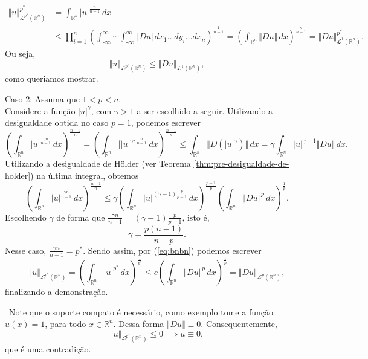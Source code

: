 \documentclass[a4paper, 11pt]{book}
\theoremstyle{definition}
\newcommand{\obs}{\noindent{\textbf{\textcolor{black}{\sffamily Observação:}}}~}
\newcommand{\m}{\text{-}}
\newcommand{\bR}{\mathbb{R}}
\newcommand{\cL}{\mathcal{L}}
\begin{document}
\begin{prf}
    \[
        \begin{aligned}
            \Vert u \Vert_{\cL^{p^*}(\bR^n)}^{p^*} &= \int_{\bR^n} |u|^{\frac{n}{n-1}} \, dx \\
            &\leqslant \prod_{i=1}^n \left( \int_{\m\infty}^{\infty} \cdots \int_{\m\infty}^\infty \Vert Du \Vert dx_1\dots dy_i \dots dx_n \right)^{\frac{1}{n-1}}
            = \left(\int_{\bR^n} \Vert Du \Vert\,dx\right)^{\frac{n}{n-1}} = \Vert Du \Vert_{\cL^1(\bR^n)}^{p^*}.
        \end{aligned}
    \]
    Ou seja,
    \begin{equation} \label{eq:desigualdadegnss}
        \Vert u \Vert_{\cL^{p^*}(\bR^n)} \leqslant\Vert Du \Vert_{\cL^1(\bR^n)},
    \end{equation}
    como queriamos mostrar.

    \underline{Caso 2:} Assuma que $1 < p < n$.\\
    Considere a função $|u|^\gamma$, com $\gamma > 1$ a ser escolhido a seguir. Utilizando a desigualdade obtida no caso $p = 1$, podemos escrever
    \[
        \left( \int_{\bR^n} |u|^{\frac{\gamma n}{n - 1}}  \, dx\right)^{\frac{n-1}{n}} = \left( \int_{\bR^n} \Big[ |u|^\gamma \Big]^{\frac{n}{n-1}} \,dx \right)^{\frac{n-1}{n}} \leqslant \int_{\bR^n} \Vert D(|u|^{\gamma}) \Vert \,dx = \gamma \int_{\bR^n} |u|^{\gamma-1} \Vert Du \Vert \,dx.
    \]
    Utilizando a desigualdade de Hölder (ver Teorema \ref{thm:pre-desigualdade-de-holder}) na última integral, obtemos
    \begin{equation} \label{eq:bnbn}
        \left( \int_{\bR^n} |u|^{\frac{\gamma n}{n - 1}}  \, dx\right)^{\frac{n-1}{n}} \leqslant \gamma\left( \int_{\bR^n} |u|^{(\gamma-1)\frac{p}{p-1}} \,dx \right)^{\frac{p-1}{p}} \left( \int_{\bR^n} \Vert Du \Vert^p \,dx \right)^{\frac{1}{p}}.
    \end{equation}
    Escolhendo $\gamma$ de forma que $\displaystyle\frac{\gamma n}{n - 1} = (\gamma -1)\frac{p}{p-1}$, isto é,
    \[
        \gamma = \frac{p(n-1)}{n-p}.
    \]
    Nesse caso, $\displaystyle\frac{\gamma n}{n-1} = p^*$. Sendo assim, por (\ref{eq:bnbn}) podemos escrever
    \[
        \Vert u \Vert_{\cL^{p^*}(\bR^n)} = \left( \int_{\bR^n} |u|^{p^*} \,dx \right)^{\frac{1}{p^*}} \leqslant c \left( \int_{\bR^n} \Vert Du \Vert^p \,dx\right)^{\frac{1}{p}} = \Vert Du \Vert_{\cL^p(\bR^n)},
    \]
    finalizando a demonstração.
\end{prf}

\obs Note que o suporte compato é necessário, como exemplo tome a função $u(x) = 1$, para todo $x \in \bR^n$. Dessa forma $\Vert Du \Vert \equiv 0$. Consequentemente,
\[
    \Vert u \Vert_{\cL^{p^*}(\bR^n)} \leqslant 0 \implies u \equiv 0,
\]
que é uma contradição.
\end{document}
